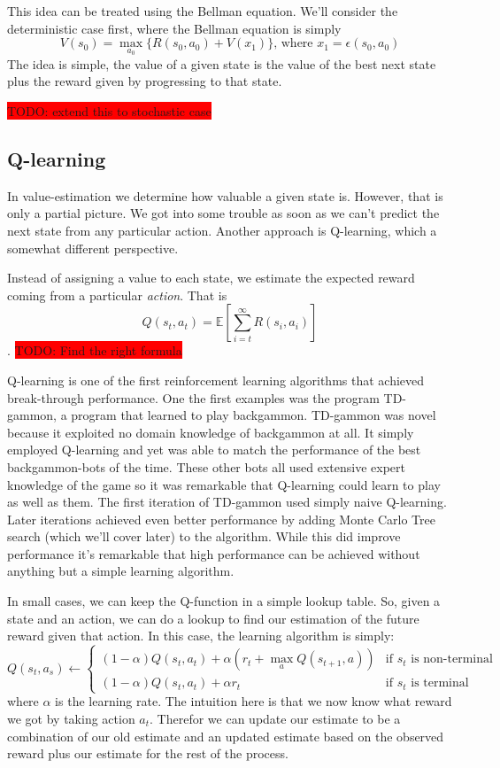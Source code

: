 \documentclass{article}
\theoremstyle{changedot}
\theoremstyle{changedotbreak}
\theoremstyle{nonumberplain}
\begin{document}
This idea can be treated using the Bellman equation. We'll consider the deterministic case first, where the Bellman equation is simply
\[V(s_{0}) = \max_{a_{0}} \{R(s_{0}, a_{0}) + V(x_{1}) \} \text{, where } x_{1} = \epsilon(s_{0}, a_{0})\]
The idea is simple, the value of a given state is the value of the best next state plus the reward given by progressing to that state. 

\colorbox{red}{TODO: extend this to stochastic case}

\subsection{Q-learning}
In value-estimation we determine how valuable a given state is. However, that is only a partial picture. We got into some trouble as soon as we can't predict the next state from any particular action. Another approach is Q-learning, which a somewhat different perspective.

Instead of assigning a value to each state, we estimate the expected reward coming from a particular \emph{action}. That is
\[Q(s_{t}, a_{t}) = \mathbb{E}[\sum_{i=t}^{\infty} R(s_{i}, a_{i})]\].
\colorbox{red}{TODO: Find the right formula}

Q-learning is one of the first reinforcement learning algorithms that achieved break-through performance. One the first examples was the program TD-gammon, a program that learned to play backgammon. TD-gammon was novel because it exploited no domain knowledge of backgammon at all. It simply employed Q-learning and yet was able to match the performance of the best backgammon-bots of the time. These other bots all used extensive expert knowledge of the game so it was remarkable that Q-learning could learn to play as well as them. The first iteration of TD-gammon used simply naive Q-learning. Later iterations achieved even better performance by adding Monte Carlo Tree search (which we'll cover later) to the algorithm. While this did improve performance it's remarkable that high performance can be achieved without anything but a simple learning algorithm.

In small cases, we can keep the Q-function in a simple lookup table. So, given a state and an action, we can do a lookup to find our estimation of the future reward given that action. In this case, the learning algorithm is simply:
\[Q(s_{t}, a_{s}) \leftarrow \begin{cases} (1 - \alpha)Q(s_{t}, a_{t}) + \alpha (r_{t} + \max_{a} Q(s_{t+1}, a)) & \text{if  $s_{t}$ is non-terminal} \\ (1 - \alpha) Q(s_{t}, a_{t}) + \alpha r_{t} & \text{if $s_{t}$ is terminal} \end{cases}\]
where $\alpha$ is the learning rate. The intuition here is that we now know what reward we got by taking action $a_{t}$. Therefor we can update our estimate to be a combination of our old estimate and an updated estimate based on the observed reward plus our estimate for the rest of the process.
\end{document}
